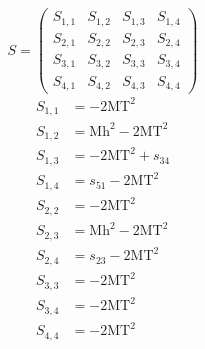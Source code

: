 \documentclass[a4paper]{article}
\begin{document}
\begin{equation}
S=\left(\begin{array}{cccc}
   S_{1,1}&
   S_{1,2}&
   S_{1,3}&
   S_{1,4}\\
   S_{2,1}&
   S_{2,2}&
   S_{2,3}&
   S_{2,4}\\
   S_{3,1}&
   S_{3,2}&
   S_{3,3}&
   S_{3,4}\\
   S_{4,1}&
   S_{4,2}&
   S_{4,3}&
   S_{4,4}\end{array}\right)
\end{equation}
\begin{subequations}
\begin{align}
   S_{1,1}&=-2\text{MT}^2\\
   S_{1,2}&=\text{Mh}^2-2\text{MT}^2\\
   S_{1,3}&=-2\text{MT}^2+s_{34}\\
   S_{1,4}&=s_{51}-2\text{MT}^2\\
   S_{2,2}&=-2\text{MT}^2\\
   S_{2,3}&=\text{Mh}^2-2\text{MT}^2\\
   S_{2,4}&=s_{23}-2\text{MT}^2\\
   S_{3,3}&=-2\text{MT}^2\\
   S_{3,4}&=-2\text{MT}^2\\
   S_{4,4}&=-2\text{MT}^2
\end{align}
\end{subequations}
\end{document}
